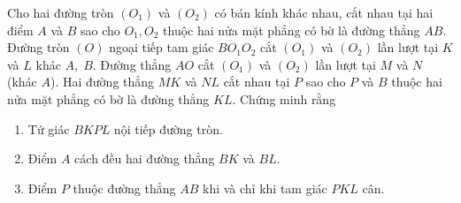 \begin{ex}%
\hfill 

Cho hai đường tròn $(O_1)$ và $(O_2)$ có bán kính khác nhau, cắt nhau tại hai điểm $A$ và $B$ sao cho $O_1, O_2$ thuộc hai nửa mặt phẳng có bờ là đường thẳng $AB$. Đường tròn $(O)$ ngoại tiếp tam giác $BO_1O_2$ cắt $(O_1)$ và $(O_2)$ lần lượt tại $K$ và $L$ khác $A,\; B$. Đường thẳng $AO$ cắt $(O_1)$ và $(O_2)$ lần lượt tại $M$ và $N$ (khác $A$). Hai đường thẳng $MK$ và $NL$ cắt nhau tại $P$ sao cho $P$ và $B$ thuộc hai nửa mặt phẳng có bờ là đường thẳng $KL$. Chứng minh rằng
\begin{enumerate}
\item Tứ giác $BKPL$ nội tiếp đường tròn.
\item Điểm $A$ cách đều hai đường thẳng $BK$ và $BL$.
\item Điểm $P$ thuộc đường thẳng $AB$ khi và chỉ khi tam giác $PKL$ cân.
\end{enumerate}

\end{ex}
